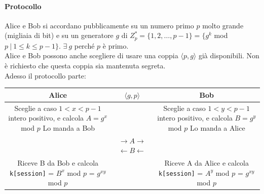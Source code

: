\documentclass[10pt]{book}
\begin{document}
\paragraph{Protocollo} Alice e Bob si accordano pubblicamente su un numero primo $p$ molto grande (migliaia di bit) e su un generatore $g$ di $Z_p^* = \{1,2,\ldots,p-1\} = \{g^k$ mod $p\:|\:1\leq k \leq p-1\}$. $\exists\:g$ perché $p$ è primo.\\
Alice e Bob possono anche scegliere di usare una coppia $\langle p,g\rangle$ già disponibili. Non è richiesto che questa coppia sia mantenuta segreta.\\
Adesso il protocollo parte:
\begin{center}
\begin{tabular}{c | c | c}
Alice&$\langle g,p \rangle$&Bob\\
\hline
\makecell{Sceglie a caso\\$1<x<p-1$\\intero positivo,\\e calcola $A=g^x$ mod $p$\\Lo manda a Bob}& &\makecell{Sceglie a caso\\$1<y<p-1$\\intero positivo,\\e calcola $B=g^y$ mod $p$\\Lo manda a Alice}\\

&\makecell{$\rightarrow A\rightarrow$\\$\leftarrow B\leftarrow$}\\
\makecell{Riceve B da Bob e calcola\\\texttt{k[session]} = $B^x$ mod $p$ = $g^{xy}$ mod $p$}& &\makecell{Riceve A da Alice e calcola\\\texttt{k[session]} = $A^y$ mod $p$ = $g^{xy}$ mod $p$}
\end{tabular}
\end{center}
\end{document}
